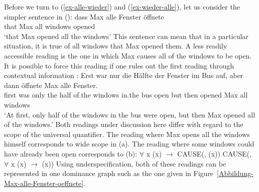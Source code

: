 Before we turn to (\ref{ex-alle-wieder}) and (\ref{ex-wieder-alle}), let us consider the simpler sentence in ():
\ea
\gll dass Max alle Fenster öffnete\\
	 that Max all windows opened\\
\glt `that Max opened all the windows'
\z
This sentence can mean that in a particular situation, it is true of all windows that Max opened them.
A less readily accessible reading is the one in which Max causes all of the windows to be open. It is possible
to force this reading if one rules out the first reading through contextual information \citep{Egg99a}:
\ea
\gll Erst war nur die Hälfte der Fenster im Bus auf, aber dann öffnete Max alle Fenster.\\
     first was only the half of.the windows in.the bus open but then opened Max all windows\\
\glt `At first, only half of the windows in the bus were open, but then Max opened all of the windows.'
\z
Both readings under discussion here differ with regard to the scope of the universal quantifier. The reading where
Max opens all the windows himself corresponds to wide scope in (a). The reading where some windows could
have already been open corresponds to (b):
\eal
\ex $\forall$ x (x) $\to$ CAUSE(, (x))
\ex CAUSE(, $\forall$ x (x) $\to$ (x))
\zl
Using underspecification, both of these readings can be represented in one dominance graph such as
the one given in Figure~\vref{Abbildung-Max-alle-Fenster-oeffnete}.
